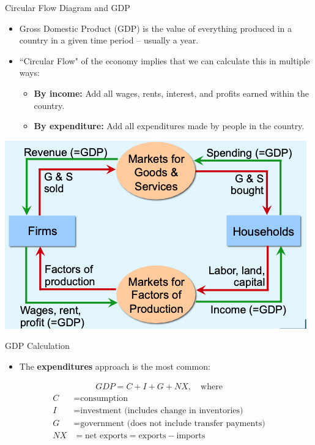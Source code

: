\documentclass[9pt]{beamer}
\begin{document}
\begin{frame}{Circular Flow Diagram and GDP}
    \begin{itemize}
        \item Gross Domestic Product (GDP) is the value of everything produced in a country in a given time period -- usually a year.
        \vspace{3pt}
        \item ``Circular Flow" of the economy implies that we can calculate this in multiple ways:
        \vspace{3pt}
        \begin{itemize}
            \item \textbf{By income:} Add all wages, rents, interest, and profits earned within the country.
            \vspace{3pt}
            \item \textbf{By expenditure:} Add all expenditures made by people in the country.
        \end{itemize}
    \end{itemize}
    \vspace{5pt}
    \centering
    \includegraphics[width=.6\textwidth]{fig1.png}
\end{frame}

\begin{frame}{GDP Calculation}
    \begin{itemize}
        \item The \textbf{expenditures} approach is the most common:
    \end{itemize}
    \begin{align*}
        GDP = C + I + G + NX, \quad \text{where}
    \end{align*}
    \begin{align*}
        C &= \text{consumption}\\
        I &= \text{investment (includes change in inventories)}\\
        G &= \text{government (does not include transfer payments)}\\
        NX &= \text{net exports} = \text{exports} - \text{imports}
    \end{align*}
\end{frame}
\end{document}
